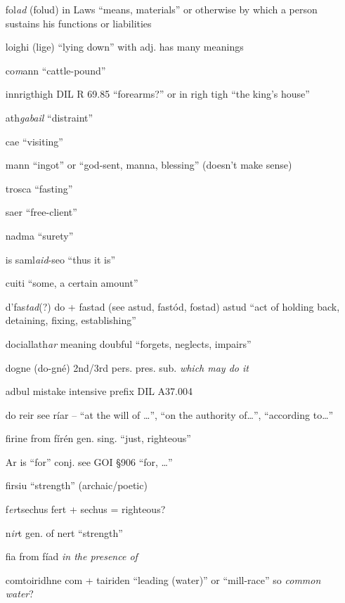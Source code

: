 \documentclass[11pt]{article}
\begin{document}
\begin{enumerate}
  \item[fol\emph{ad}] (folud) in Laws \enquote{means, materials} or otherwise by which a person sustains his functions or liabilities
  \item[loighi] (lige) \enquote{lying down} with adj. has many meanings
  \item[co\emph{m}ann] \enquote{cattle-pound}
  \item[innrigthigh] DIL R 69.85 \enquote{forearms?} or in righ tigh \enquote{the king's house}
  \item[ath\emph{gabail}] \enquote{distraint}
  \item[cae] \enquote{visiting}
  \item[mann] \enquote{ingot} or \enquote{god-sent, manna, blessing} (doesn't make sense)
  \item[trosca] \enquote{fasting}
  \item[saer] \enquote{free-client}
  \item[nadma] \enquote{surety}
  \item[is saml\emph{aid}-seo] \enquote{thus it is}
  \item[cuiti] \enquote{some, a certain amount}
  \item[d'fas\emph{tad}(?)] do + fastad (see astud, fast\'{o}d, fostad) astud \enquote{act of holding back, detaining, fixing, establishing}
  \item[dociallath\emph{ar}] meaning doubful \enquote{forgets, neglects, impairs}
  \item[dogne] (do-gn\'{e}) 2nd/3rd pers. pres. sub. \emph{which may do it}
  \item[adbul] mistake intensive prefix DIL A37.004
  \item[do reir] see r\'{i}ar -- \enquote{at the will of \ldots}, \enquote{on the authority of\ldots}, \enquote{according to\ldots}
  \item[firine] from f\'{i}r\'{e}n gen. sing. \enquote{just, righteous}
  \item[Ar is] \enquote{for} conj. see GOI \S 906 \enquote{for, \ldots}
  \item[firsiu] \enquote{strength} (archaic/poetic)
  \item[f\emph{er}tsechus] fert + sechus = righteous?
  \item[n\emph{ir}t] gen. of nert \enquote{strength}
  \item[fia] from f\'{i}ad \emph{in the presence of}
  \item[comtoiridhne] com + tairiden \enquote{leading (water)} or \enquote{mill-race} so \emph{common water}?

\end{enumerate}
\end{document}

